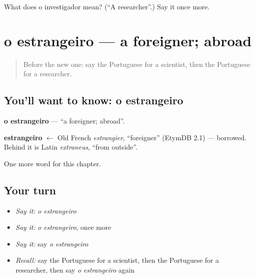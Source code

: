 \begin{tcolorbox}[breakable,colback=teal!4,colframe=teal!35!black,title={Before you move on}]
What does o investigador mean? (\textquotedblleft{}A researcher\textquotedblright{}.) Say it once more.
\end{tcolorbox}
\section[o estrangeiro]{o estrangeiro — a foreigner; abroad}

\label{lesson:PT-C160-estrangeiro}



\begin{quote}
Before the new one: say the Portuguese for a scientist, then the Portuguese for a researcher.
\end{quote}

\subsection*{You'll want to know: o estrangeiro}
\textbf{o estrangeiro} — \textquotedblleft{}a foreigner; abroad\textquotedblright{}.

\begin{cousinweb}
\textbf{estrangeiro} $\leftarrow$ Old French \emph{estrangier}, \textquotedblleft{}foreigner\textquotedblright{} (EtymDB 2.1) — borrowed. Behind it is Latin \emph{extraneus}, \textquotedblleft{}from outside\textquotedblright{}.
\end{cousinweb}

\begin{grammarlens}[title={What you've built}]
One more word for this chapter.
\end{grammarlens}

\subsection*{Your turn}
\begin{itemize}
\raggedright
  \item \emph{Say it:} \emph{o estrangeiro}
  \item \emph{Say it:} \emph{o estrangeiro}, once more
  \item \emph{Say it:} say \emph{o estrangeiro}
  \item \emph{Recall:} say the Portuguese for a scientist, then the Portuguese for a researcher, then say \emph{o estrangeiro} again
\end{itemize}


